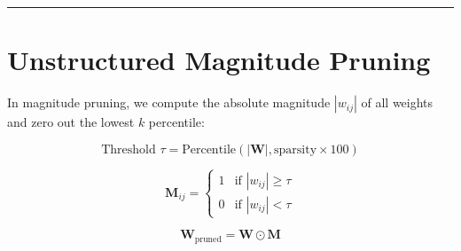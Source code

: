 \documentclass[
  letterpaper,
]{scrbook}
\begin{document}
\begin{center}\rule{0.5\linewidth}{0.5pt}\end{center}

\section{Unstructured Magnitude
Pruning}\label{unstructured-magnitude-pruning}

In magnitude pruning, we compute the absolute magnitude \(|w_{ij}|\) of
all weights and zero out the lowest \(k\) percentile:

\[\text{Threshold } \tau = \text{Percentile}(|\mathbf{W}|, \text{sparsity}\times 100)\]

\[\mathbf{M}_{ij} = \begin{cases} 1 & \text{if } |w_{ij}| \ge \tau \\ 0 & \text{if } |w_{ij}| < \tau \end{cases}\]

\[\mathbf{W}_{\text{pruned}} = \mathbf{W} \odot \mathbf{M}\]
\end{document}
